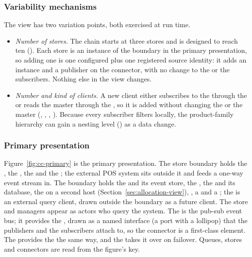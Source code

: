 \subsubsection{Variability mechanisms}
\label{sec:cc-variability}
The view has two variation points, both exercised at run time.
\begin{itemize}[nosep]
  \item \emph{Number of stores.} The chain starts at three stores and is designed to
  reach ten (). Each store is an instance of the \Store boundary in the
  primary presentation, so adding one is one configured \StoreAgent plus one registered
  source identity: it adds an instance and a publisher on the \IEP connector, with no
  change to the \CFE or the subscribers. Nothing else in the view changes.
  \item \emph{Number and kind of clients.} A new client either subscribes to the \CFE
  through the \IEP or reads the master through the \InventoryQuery, so it is added
  without changing the \CFE or the master (, ,
  , ). Because every subscriber filters locally, the
  product-family hierarchy can gain a nesting level () as a data change.
\end{itemize}

\subsubsection{Primary presentation}
Figure~\ref{fig:cc-primary} is the primary presentation. The store boundary holds the
\POSAdapter, the \StoreAgent, the \StoreLocalInventory and the \Outbox; the external POS
system sits outside it and feeds a one-way event stream in. The \DC boundary holds the
\CFE and its event store, the \DCAgent, the \CentralMasterInventory and its database,
the \StandbyMaster on a second \DC host (Section~\ref{sec:allocation-view}),
\ShippingOrderFulfillment, a \StoreTrackingClient and a \ReportingClient; the
\AnalyticsClient is an external query client, drawn outside the boundary as a future client.
The store and \DC managers appear as actors who query the system. The \CFE is the pub-sub
event bus; it provides the \IEP, drawn as a named interface (a port with a lollipop) that
the publishers and the subscribers attach to, so the connector is a first-class element.
The \CentralMasterInventory provides the \InventoryQuery the same way, and the
\StandbyMaster takes it over on failover. Queues, stores and connectors are read from the
figure's key.

